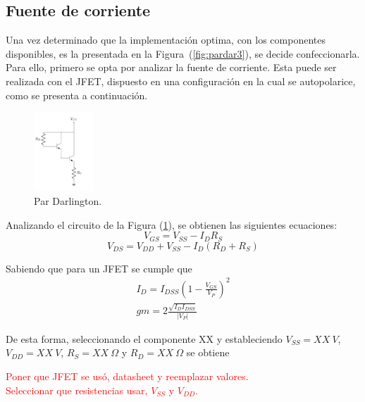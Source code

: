 \subsection{Fuente de corriente}
Una vez determinado que la implementación optima, con los componentes disponibles, es la presentada en la Figura~(\ref{fig:pardar3}), se decide confeccionarla. Para ello, primero se opta por analizar la fuente de corriente. Esta puede ser realizada con el JFET, dispuesto en una configuración en la cual se autopolarice, como se presenta a continuación.
\begin{figure}[H]
\centering
	\includegraphics[width=0.2\textwidth, page=4]{Imagenes/ParDarlington.pdf}
	\caption{Par Darlington.}
	\label{fig:fuentei}
\end{figure}

Analizando el circuito de la Figura (\ref{fig:fuentei}), se obtienen las siguientes ecuaciones:
\begin{equation}
	V_{GS} = V_{SS} - I_{D} R_{S}
\end{equation}
\begin{equation}
	V_{DS} = V_{DD} + V_{SS} - I_{D} \left( R_{D} + R_{S} \right)
\end{equation}

Sabiendo que para un JFET se cumple que
\begin{equation}
\begin{split}
	I_D = I_{DSS} \left( 1- \frac{V_{GS}}{V_P} \right)^2 \\
	gm = 2\frac{\sqrt{I_D I_{DSS}}}{|V_P|}
\end{split}
\end{equation}

De esta forma, seleccionando el componente XX %
y estableciendo $V_{SS} = XX \ V$, $V_{DD} = XX \ V$, $R_S = XX \ \Omega$ y $R_D = XX \ \Omega$ se obtiene
\begin{center}
	\LARGE{\textcolor{red}{Poner que JFET se usó, datasheet y reemplazar valores.}} \\
	\LARGE{\textcolor{red}{Seleccionar que resistencias usar, $V_{SS}$ y $V_{DD}$.}}
\end{center}

